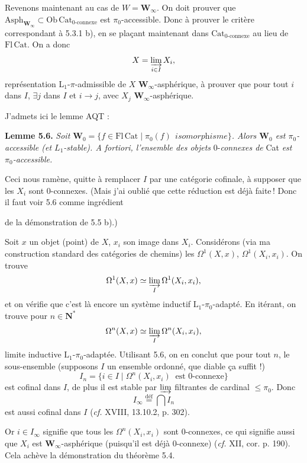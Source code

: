 \documentclass[11pt]{article}
\newcommand{\printedpage}[1]{\marginpar{\footnotesize p.~#1}}
\newcommand{\msp}[1]{\marginpar{\footnotesize [#1]}}
\begin{document}
Revenons maintenant au cas de $W = \mathbf{W}_\infty$. On doit prouver que $\mathrm{Asph}_{\mathbf{W}_\infty} \subset \mathrm{Ob}\,\mathrm{Cat}_{\text{0-connexe}}$ est $\pi_0$-accessible. Donc à prouver le critère correspondant à 5.3.1 b), en se plaçant maintenant dans $\mathrm{Cat}_{\text{0-connexe}}$ au lieu de $\mathrm{Fl}\,\mathrm{Cat}$. On a donc
\[
X = \varinjlim_{i\in I} X_i,
\]
représentation L$_1$-$\pi$-admissible de $X$ $\mathbf{W}_\infty$-asphérique, à prouver que pour tout $i$ dans $I$, $\exists j$ dans $I$ et $i \longrightarrow j$, avec $X_j$ $\mathbf{W}_\infty$-asphérique.

J'admets ici le lemme AQT :

\textbf{Lemme 5.6.} \textit{Soit $\mathbf{W}_0 = \{f \in \mathrm{Fl}\,\mathrm{Cat} \mid \pi_0(f) \ \ \textit{isomorphisme}\}$. Alors $\mathbf{W}_0$ est $\pi_0$-accessible (et $L_1$-stable). A fortiori, l'ensemble des objets} 0-\textit{connexes de} Cat \textit{est $\pi_0$-accessible.}

Ceci nous ramène, quitte à remplacer $I$ par une catégorie cofinale, à supposer que les $X_i$ sont 0-connexes. (Mais j'ai oublié que cette réduction est déjà faite\,! Donc il faut voir 5.6 comme ingrédient

\printedpage{44}

\msp{page 82}
de la démonstration de 5.5 b).)

Soit $x$ un objet (point) de $X$, $x_i$ son image dans $X_i$. Considérons (via ma construction standard des catégories de chemins) les $\Omega^1(X,x)$, $\Omega^1(X_i,x_i)$. On trouve
\[ \Omega^1(X,x) \simeq \varinjlim_{I} \Omega^1(X_i,x_i), \]
et on vérifie que c'est là encore un système inductif $\mathrm{L}_1$-$\pi_0$-adapté. En itérant, on trouve pour $n \in \mathbf{N}^*$
\[ \Omega^n(X,x) \simeq \varinjlim_{I} \Omega^n(X_i,x_i), \]
limite inductive $\mathrm{L}_1$-$\pi_0$-adaptée. Utilisant 5.6, on en conclut que pour tout $n$, le sous-ensemble (supposons $I$ un ensemble ordonné, que diable ça suffit !)
\[ I_n = \{ i \in I \mid \Omega^n(X_i,x_i) \ \text{ est 0-connexe} \} \]
est cofinal dans $I$, de plus il est stable par $\varinjlim$ filtrantes de cardinal $\leq \pi_0$. Donc %
\[ I_\infty \overset{\text{déf}}{=} \bigcap I_n \]
est aussi cofinal dans $I$ (\textit{cf.} XVIII, 13.10.2, p. 302).

\msp{page 83}
Or $i \in I_\infty$ signifie que tous les $\Omega^n(X_i,x_i)$ sont 0-connexes, ce qui signifie aussi que $X_i$ est $\mathbf{W}_\infty$-asphérique (puisqu'il est déjà 0-connexe) (\textit{cf.} XII, cor. p. 190). Cela achève la démonstration du théorème 5.4.
\end{document}
